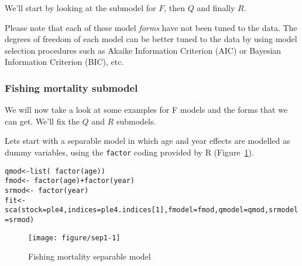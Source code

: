 \documentclass[a4paper,english,10pt]{article}\usepackage[]{graphicx}\usepackage[]{color}
\makeatletter
\def\maxwidth{ %
  \ifdim\Gin@nat@width>\linewidth
    \linewidth
  \else
    \Gin@nat@width
  \fi
}
\newcommand{\hlnum}[1]{\textcolor[rgb]{0.2,0.2,0.2}{#1}}%
\newcommand{\hlopt}[1]{\textcolor[rgb]{0.2,0.2,0.2}{#1}}%
\newcommand{\hlstd}[1]{\textcolor[rgb]{0,0,0}{#1}}%
\newcommand{\hlkwb}[1]{\textcolor[rgb]{0.361,0.506,0.596}{#1}}%
\newcommand{\hlkwc}[1]{\textcolor[rgb]{0.361,0.506,0.596}{#1}}%
\newcommand{\hlkwd}[1]{\textcolor[rgb]{0.361,0.506,0.596}{#1}}%
\newenvironment{kframe}{%
 \def\at@end@of@kframe{}%
 \ifinner\ifhmode%
  \def\at@end@of@kframe{\end{minipage}}%
  \begin{minipage}{\columnwidth}%
 \fi\fi%
 \def\FrameCommand##1{\hskip\@totalleftmargin \hskip-\fboxsep
 \colorbox{shadecolor}{##1}\hskip-\fboxsep
     \hskip-\linewidth \hskip-\@totalleftmargin \hskip\columnwidth}%
 \MakeFramed {\advance\hsize-\width
   \@totalleftmargin\z@ \linewidth\hsize
   \@setminipage}}%
 {\par\unskip\endMakeFramed%
 \at@end@of@kframe}
\newenvironment{knitrout}{}{} %
\newcommand{\code}[1]{{\texttt{#1}}}
\makeatother
\begin{document}
We'll start by looking at the submodel for $F$, then $Q$ and finally $R$.

Please note that each of these model \emph{forms} have not been tuned to the data. The degrees of freedom of each model can be better tuned to the data by using model selection procedures such as Akaike Information Criterion (AIC) or Bayesian Information Criterion (BIC), etc.

\subsubsection{Fishing mortality submodel}

We will now take a look at some examples for F models and the forms that we can get. We'll fix the $Q$ and $R$ submodels. 

Lets start with a separable model in which age and year effects are modelled as dummy variables, using the \code{factor} coding provided by R (Figure~\ref{fig:sep1}). 

\begin{knitrout}
\color{fgcolor}\begin{kframe}
\begin{alltt}
\hlstd{qmod} \hlkwb{<-} \hlkwd{list}\hlstd{(}\hlopt{~} \hlkwd{factor}\hlstd{(age))}
\hlstd{fmod} \hlkwb{<-} \hlopt{~} \hlkwd{factor}\hlstd{(age)} \hlopt{+} \hlkwd{factor}\hlstd{(year)}
\hlstd{srmod} \hlkwb{<-} \hlopt{~} \hlkwd{factor}\hlstd{(year)}
\hlstd{fit} \hlkwb{<-} \hlkwd{sca}\hlstd{(}\hlkwc{stock} \hlstd{= ple4,} \hlkwc{indices} \hlstd{= ple4.indices[}\hlnum{1}\hlstd{],} \hlkwc{fmodel}\hlstd{=fmod,} \hlkwc{qmodel}\hlstd{=qmod,} \hlkwc{srmodel}\hlstd{=srmod)}
\end{alltt}
\end{kframe}
\end{knitrout}

\begin{knitrout}
\color{fgcolor}\begin{figure}[H]

{\centering \texttt{[image: figure/sep1-1]} 

}

\caption[Fishing mortality separable model]{Fishing mortality separable model\label{fig:sep1}}
\end{figure}


\end{knitrout}
\end{document}
